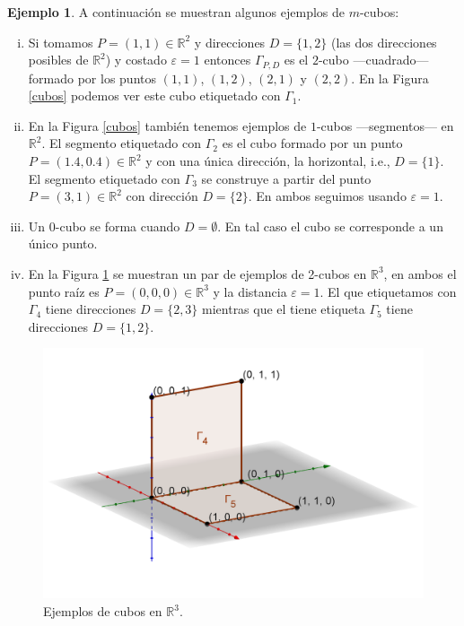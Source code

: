 \documentclass[12pt,a4paper,twoside]{article} %
\theoremstyle{plain}
\theoremstyle{definition}
\newtheorem{ejemplo}{Ejemplo}[subsection]
\newcommand{\R}{\mathbb{R}}
\begin{document}
\begin{ejemplo}
A continuación se muestran algunos ejemplos de $m$-cubos:
\begin{enumerate}[(i)]
\item Si tomamos $P=(1,1)\in\R^2$ y direcciones $D= \{ 1,2 \}$ (las dos direcciones posibles de $\R^2$) y costado $\varepsilon = 1$ entonces $\Gamma_{P,D}$ es el $2$-cubo ---cuadrado--- formado por los puntos $(1,1)$, $(1,2)$, $(2,1)$ y $(2,2)$. En la Figura \ref{cubos} podemos ver este cubo etiquetado con $\Gamma_1$. 
\item En la Figura \ref{cubos} también tenemos ejemplos de $1$-cubos ---segmentos--- en $\R^2$. El segmento etiquetado con $\Gamma_2$ es el cubo formado por un punto $P=(1.4,0.4)\in \R^2$ y con una única dirección, la horizontal, i.e., $D= \{ 1\}$. El segmento etiquetado con $\Gamma_3$ se construye a partir del punto $P=(3,1)\in\R^2$ con dirección $D= \{ 2\}$. En ambos seguimos usando $\varepsilon = 1$.
\item Un $0$-cubo se forma cuando $D= \emptyset$. En tal caso el cubo se corresponde a un único punto.
\item En la Figura \ref{cubos3d} se muestran un par de ejemplos de 2-cubos en $\R^3$, en ambos el punto raíz es $P=(0,0,0)\in \R^3$ y la distancia $\varepsilon=1$. El que etiquetamos con $\Gamma_4$ tiene direcciones $D= \{2,3 \}$ mientras que el tiene etiqueta $\Gamma_5$ tiene direcciones $D= \{1,2 \}$.
\end{enumerate}
\end{ejemplo}


\begin{figure}[h]
\centering
\includegraphics[scale=0.6]{img/cubos3d.png}
\caption{Ejemplos de cubos en $\R^3$.}
\label{cubos3d}
\end{figure}
\end{document}
